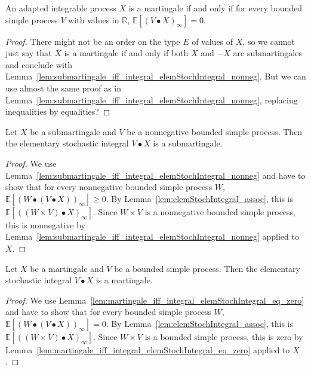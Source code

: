\begin{lemma}\label{lem:martingale_iff_integral_elemStochIntegral_eq_zero}
An adapted integrable process $X$ is a martingale if and only if for every bounded simple process $V$ with values in $\mathbb{R}$, $\mathbb{E}[(V \bullet X)_\infty] = 0$.
\end{lemma}

\begin{proof}
There might not be an order on the type $E$ of values of $X$, so we cannot just say that $X$ is a martingale if and only if both $X$ and $-X$ are submartingales and conclude with Lemma~\ref{lem:submartingale_iff_integral_elemStochIntegral_nonneg}.
But we can use almost the same proof as in Lemma~\ref{lem:submartingale_iff_integral_elemStochIntegral_nonneg}, replacing inequalities by equalities?
\end{proof}


\begin{lemma}\label{lem:Submartingale.elemStochIntegral}
Let $X$ be a submartingale and $V$ be a nonnegative bounded simple process.
Then the elementary stochastic integral $V \bullet X$ is a submartingale.
\end{lemma}

\begin{proof}
We use Lemma~\ref{lem:submartingale_iff_integral_elemStochIntegral_nonneg} and have to show that for every nonnegative bounded simple process $W$, $\mathbb{E}[(W \bullet (V \bullet X))_\infty] \ge 0$.
By Lemma~\ref{lem:elemStochIntegral_assoc}, this is $\mathbb{E}[((W \times V) \bullet X)_\infty]$.
Since $W \times V$ is a nonnegative bounded simple process, this is nonnegative by Lemma~\ref{lem:submartingale_iff_integral_elemStochIntegral_nonneg} applied to $X$.
\end{proof}


\begin{lemma}\label{lem:Martingale.elemStochIntegral}
Let $X$ be a martingale and $V$ be a bounded simple process.
Then the elementary stochastic integral $V \bullet X$ is a martingale.
\end{lemma}

\begin{proof}
We use Lemma~\ref{lem:martingale_iff_integral_elemStochIntegral_eq_zero} and have to show that for every bounded simple process $W$, $\mathbb{E}[(W \bullet (V \bullet X))_\infty] = 0$.
By Lemma~\ref{lem:elemStochIntegral_assoc}, this is $\mathbb{E}[((W \times V) \bullet X)_\infty]$.
Since $W \times V$ is a bounded simple process, this is zero by Lemma~\ref{lem:martingale_iff_integral_elemStochIntegral_eq_zero} applied to $X$.
\end{proof}


